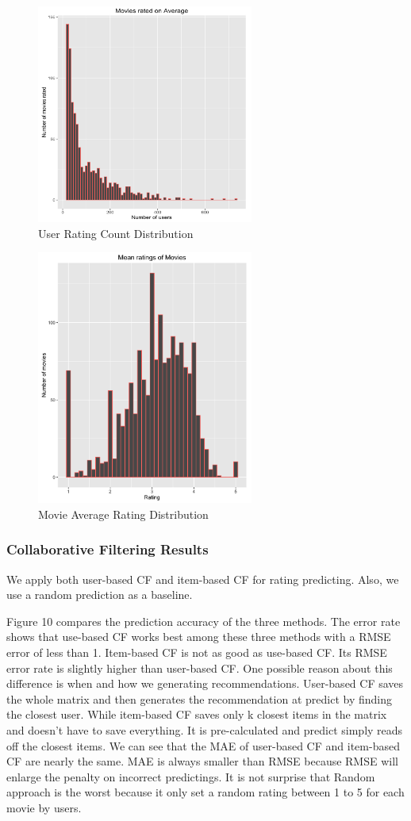 \documentclass[conference]{IEEEtran}
\begin{document}
\begin{figure}
	\centering
	\includegraphics[width=2.8in]{user_rating.png}
	\caption{User Rating Count Distribution}
	\label{fig:side:a}
\end{figure}

\begin{figure}
	\centering
	\includegraphics[width=2.8in]{movie_rating.png}
	\caption{Movie Average Rating Distribution}
	\label{fig:side:a}
\end{figure}

\subsubsection{Collaborative Filtering Results}
We apply both user-based CF and item-based CF for rating predicting. Also, we use a random prediction as a baseline. 

Figure 10 compares the prediction accuracy of the three methods. The  error rate shows that use-based CF works best among these three methods with a RMSE error of less than 1. Item-based CF is not as good as use-based CF. Its RMSE error rate is slightly higher than user-based CF. One possible reason about this difference is when and how we generating recommendations. User-based CF saves the whole matrix and then generates the recommendation at predict by finding the closest user. While item-based CF saves only k closest items in the matrix and doesn’t have to save everything. It is pre-calculated and predict simply reads off the closest items. We can see that the MAE of user-based CF and item-based CF are nearly the same. MAE is always smaller than RMSE because RMSE will enlarge the penalty on incorrect predictings. It is not surprise that Random approach is the worst because it only set a random rating between 1 to 5 for each movie by users.
\end{document}
